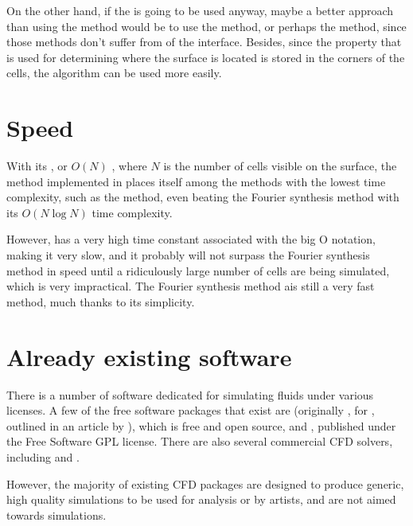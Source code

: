 On the other hand, if the \FVM is going to be used anyway, maybe a better approach than using the \VOF method would be to use the \LS method, or perhaps the \CLSVOF method, since those methods don't suffer from \diffusion of the interface. Besides, since the property that is used for determining where the surface is located is stored in the corners of the cells, the  algorithm can be used more easily.

\section{Speed}

With its , or $O(N)$ , where $N$ is the number of cells visible on the surface, the method implemented in \thisprojectwork places itself among the methods with the lowest time complexity, such as the \LPD method, even beating the Fourier synthesis method with its $O(N \log N)$ time complexity.

However, \thismethod has a very high time constant associated with the big O notation, making it very slow, and it probably will not surpass the Fourier synthesis method in speed until a ridiculously large number of cells are being simulated, which is very impractical. The Fourier synthesis method ais still a very fast method, much thanks to its simplicity.

\section{Already existing software}

There is a number of software dedicated for simulating fluids under various licenses. A few of the free \CFD software packages that exist are \OpenFOAM (originally , for \textit{}, outlined in an article by \citet{Weller1998}), which is free and open source, and \Gerris \citep{Popinet2003}, published under the Free Software GPL license. There are also several commercial CFD solvers, including \RealFlow and . %

However, the majority of existing CFD packages are designed to produce generic, high quality simulations to be used for analysis or by artists, and are not aimed towards \realtime simulations.
